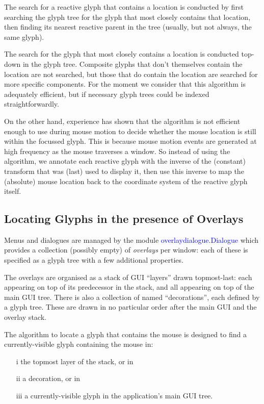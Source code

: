 \documentclass[12pt,a4paper]{article}
\def\Scala#1{\textcolor{blue}{\textsf{#1}}}
\def\SS#1{\subsection{#1}}
\begin{document}
The search for a reactive glyph that contains a location is conducted
by first searching the glyph tree for the glyph
that most closely contains that location, then finding its nearest
reactive parent in the tree (usually, but not always, the same
glyph).

The search for the glyph that most closely contains a location is
conducted top-down in the glyph tree.  Composite glyphs that don't
themselves contain the location are not searched, but those that
do contain the location are searched for more specific components.
For the moment we consider that this algorithm is adequately
efficient, but if necessary glyph trees could be indexed
straightforwardly.


On the other hand, experience has shown that the algorithm
is not efficient enough to use during mouse motion to decide
whether the mouse location is still within the focussed glyph. This is
because mouse motion events are generated at high frequency as the
mouse traverses a window. So instead of using the algorithm, we
annotate each reactive glyph with the inverse of the (constant)
transform that was (last) used to display it, then use this
inverse to map the (absolute) mouse location back to the coordinate
system of the reactive glyph itself.

\SS{Locating  Glyphs in the presence of Overlays}
Menus and dialogues are managed by the module
\Scala{overlaydialogue.Dialogue} which provides a collection
(possibly empty) of \textit{overlays} per window: each of these is specified as a
glyph tree with a few additional properties.

The overlays  are organised as a stack of GUI ``layers''
drawn topmost-last: each appearing  on top of its predecessor in
the stack, and all appearing on top of the main GUI tree.
There is also a collection of named ``decorations'', each defined
by a glyph tree. These are drawn in no particular order after the
main GUI and the overlay stack. 

The algorithm to locate a glyph that contains the mouse is designed to find
a currently-visible glyph containing the mouse in:

\begin{enumerate}
\item[i] the topmost layer of the stack, or in
\item[ii] a decoration, or in
\item[iii] a currently-visible glyph in the application's main GUI tree.
\end{enumerate}
\end{document}
